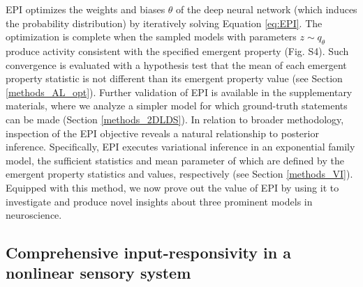 \documentclass[11pt]{article}
\begin{document}
EPI optimizes the weights and biases $\theta$ of the deep neural network (which induces the probability distribution) by iteratively solving Equation \ref{eq:EPI}. 
The optimization is complete when the sampled models with parameters $z \sim q_\theta$ produce activity consistent with the specified emergent property (Fig. S4).
Such convergence is evaluated with a hypothesis test that the mean of each emergent property statistic is not different than its emergent property value (see Section \ref{methods_AL_opt}). 
Further validation of EPI is available in the supplementary materials, where we analyze a simpler model for which ground-truth statements can be made (Section \ref{methods_2DLDS}).
In relation to broader methodology, inspection of the EPI objective reveals a natural relationship to posterior inference.
Specifically, EPI executes variational inference in an exponential family model, the sufficient statistics and mean parameter of which are defined by the emergent property statistics and values, respectively (see Section \ref{methods_VI}).
Equipped with this method, we now prove out the value of EPI by using it to investigate and produce novel insights about three prominent models in neuroscience.

\subsection{Comprehensive input-responsivity in a nonlinear sensory system} \label{results_V1}
\end{document}
